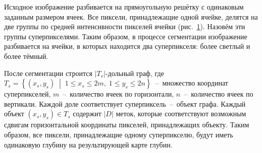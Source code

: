 \documentclass{ConfFTI}
\begin{document}
Исходное изображение разбивается на прямоугольную решётку
с одинаковым заданным размером ячеек.
Все пиксели, принадлежащие одной ячейке,
делятся на две группы по средней интенсивности пикселей ячейки
(рис.~\ref{fig:cell:superpixels}).
Назовём эти группы суперпикселями.
Таким образом, в процессе сегментации изображение разбивается на ячейки,
в которых находится два суперпикселя: более светлый и более тёмный.

\begin{figure}[h!]
    \centering
     \qquad
    \label{fig:cell:superpixels}
\end{figure}

После сегментации строится $\left| T_s \right|$-дольный граф,
где
$T_s = \left\{
    \left(x_s, y_s \right) \; \middle| \;
    1 \le x_s \le 2m, \;
    1 \le y_s \le 2n
\right\}$~--~множество координат суперпикселей,
$m$~--~количество ячеек по горизонтали,
$n$~--~количество ячеек по вертикали.
Каждой доле соответствует суперпиксель~--~объект графа.
Каждый объект $\left( x_s, y_s \right) \in T_s$ содержит
$\left| D \right|$ меток,
которые соответствуют возможным сдвигам горизонтальной координаты пикселей,
принадлежащих объекту.
Таким образом, все пиксели,
принадлежащие одному суперпикселю,
будут иметь одинаковую глубину на результирующей карте глубин.
\end{document}
